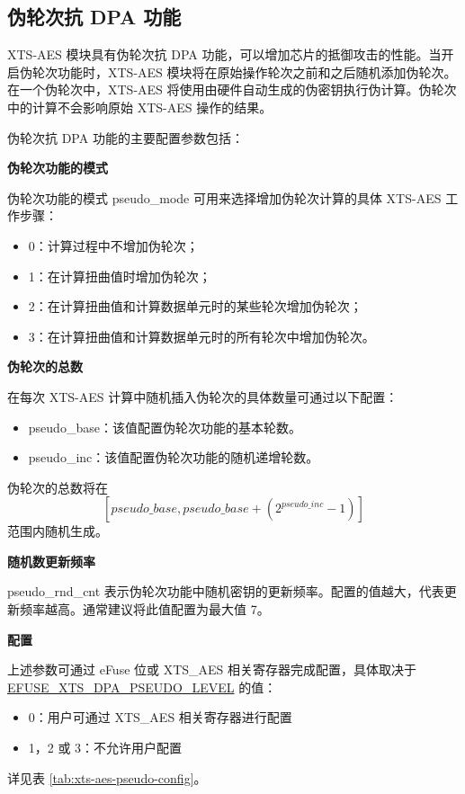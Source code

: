 \documentclass[main\_\_CN.tex]{subfiles}
\begin{document}
\subsection{伪轮次抗 DPA 功能}

\chipname{} XTS-AES 模块具有伪轮次抗 DPA 功能，可以增加芯片的抵御攻击的性能。当开启伪轮次功能时，XTS-AES 模块将在原始操作轮次之前和之后随机添加伪轮次。在一个伪轮次中，XTS-AES 将使用由硬件自动生成的伪密钥执行伪计算。伪轮次中的计算不会影响原始 XTS-AES 操作的结果。

伪轮次抗 DPA 功能的主要配置参数包括：

\textbf{伪轮次功能的模式}

伪轮次功能的模式 pseudo\_mode 可用来选择增加伪轮次计算的具体 XTS-AES 工作步骤：
\begin{itemize}
    \item 0：计算过程中不增加伪轮次；
    \item 1：在计算扭曲值时增加伪轮次；
    \item 2：在计算扭曲值和计算数据单元时的某些轮次增加伪轮次；
    \item 3：在计算扭曲值和计算数据单元时的所有轮次中增加伪轮次。
\end{itemize}

\textbf{伪轮次的总数}

在每次 XTS-AES 计算中随机插入伪轮次的具体数量可通过以下配置：
\begin{itemize}
    \item pseudo\_base：该值配置伪轮次功能的基本轮数。
    \item pseudo\_inc：该值配置伪轮次功能的随机递增轮数。
\end{itemize}
伪轮次的总数将在 $$[pseudo\_base,pseudo\_base+(2^{pseudo\_inc}-1)]$$ 范围内随机生成。

\textbf{随机数更新频率}

pseudo\_rnd\_cnt 表示伪轮次功能中随机密钥的更新频率。配置的值越大，代表更新频率越高。通常建议将此值配置为最大值 7。

\textbf{配置}

上述参数可通过 eFuse 位或 XTS\_AES 相关寄存器完成配置，具体取决于 \hyperref[fielddesc:EFUSEXTSDPAPSEUDOLEVEL]{EFUSE\_XTS\_DPA\_PSEUDO\_LEVEL} 的值：
\begin{itemize}
    \item 0：用户可通过 XTS\_AES 相关寄存器进行配置
    \item 1，2 或 3：不允许用户配置
\end{itemize}
详见表 \ref{tab:xts-aes-pseudo-config}。
\end{document}
